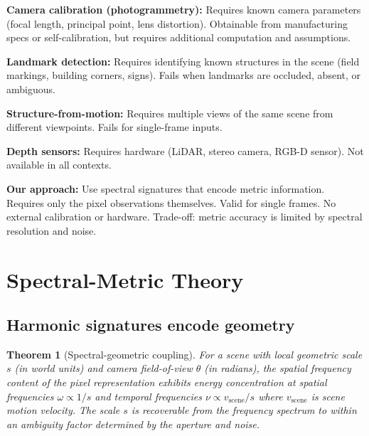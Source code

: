 \documentclass[11pt,twocolumn,a4paper]{article}
\newtheorem{theorem}{Theorem}[section]
\theoremstyle{definition}
\begin{document}
\textbf{Camera calibration (photogrammetry):} Requires known camera parameters (focal length, principal point, lens distortion). Obtainable from manufacturing specs or self-calibration, but requires additional computation and assumptions.

\textbf{Landmark detection:} Requires identifying known structures in the scene (field markings, building corners, signs). Fails when landmarks are occluded, absent, or ambiguous.

\textbf{Structure-from-motion:} Requires multiple views of the same scene from different viewpoints. Fails for single-frame inputs.

\textbf{Depth sensors:} Requires hardware (LiDAR, stereo camera, RGB-D sensor). Not available in all contexts.

\textbf{Our approach:} Use spectral signatures that encode metric information. Requires only the pixel observations themselves. Valid for single frames. No external calibration or hardware. Trade-off: metric accuracy is limited by spectral resolution and noise.

\section{Spectral-Metric Theory}
\label{sec:theory}

\subsection{Harmonic signatures encode geometry}

\begin{theorem}[Spectral-geometric coupling]
\label{thm:spectral_geom}
For a scene with local geometric scale $s$ (in world units) and camera field-of-view $\theta$ (in radians), the spatial frequency content of the pixel representation exhibits energy concentration at spatial frequencies $\omega \propto 1/s$ and temporal frequencies $\nu \propto v_{\text{scene}}/s$ where $v_{\text{scene}}$ is scene motion velocity. The scale $s$ is recoverable from the frequency spectrum to within an ambiguity factor determined by the aperture and noise.
\end{theorem}
\end{document}
